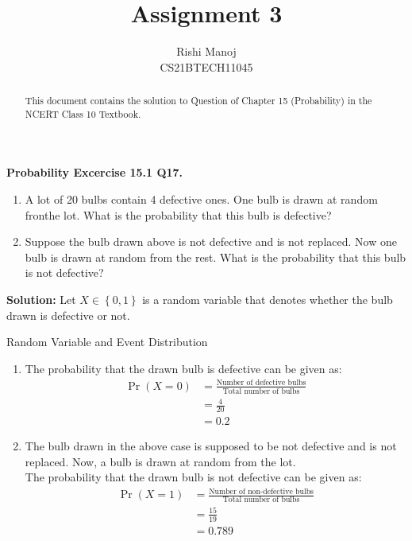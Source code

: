 \documentclass[journal,12pt,twocolumn]{IEEEtran}
\title{Assignment 3}
\author{Rishi Manoj\\CS21BTECH11045}
\date{}
\providecommand{\pr}[1]{\ensuremath{\Pr\left(#1\right)}}
\providecommand{\cbrak}[1]{\ensuremath{\left\{#1\right\}}}
\newcommand{\solution}{\noindent \textbf{Solution: }}
\begin{document}
\maketitle
\begin{abstract}
		This document contains the solution to Question of Chapter 15 (Probability) in the NCERT Class 10 Textbook.
\end{abstract}
	
	\textbf{Probability Excercise 15.1 Q17.}
	 
\begin{enumerate}[label=(\roman{enumi})]
     \item A lot of 20 bulbs contain 4 defective ones. One bulb is drawn at  random fronthe lot. What is the probability that this bulb is defective?
     \item Suppose the bulb drawn above is not defective and is not replaced. Now one bulb is drawn at random from the rest. What is the probability that this bulb is not defective?
\end{enumerate} 
\solution Let $X\in \cbrak{0,1}$ is a random variable that denotes whether the bulb drawn is defective or not.
\begin{table}[ht!]
		\centering
		
		\caption{Random Variable and Event Distribution}
		\label{table:1}
\end{table}
\begin{enumerate}[label=(\roman{enumi})]
     \item The probability that the drawn bulb is defective can be given as:
     \begin{align}
              \pr{X=0} &= \frac{\text{Number of defective bulbs}}{\text{Total number of bulbs}}\\
              &= \frac{4}{20}\\
              &= 0.2
     \end{align}
     \item The bulb drawn in the above case is supposed to be not defective and is not replaced. Now, a bulb is drawn at random from the lot.\\
     The probability that the drawn bulb is not defective can be given as:
     \begin{align}
              \pr{X=1} &= \frac{\text{Number of non-defective bulbs}}{\text{Total number of bulbs}}\\
              &= \frac{15}{19}\\
              &= 0.789
     \end{align}
\end{enumerate}
\end{document}
